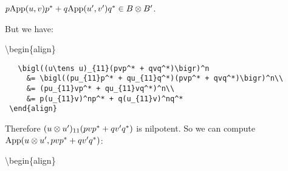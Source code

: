 \begin{description}
\tightlist
\item[]
\(p\mathrm{App}(u, v)p^* + q\mathrm{App}(u', v')q^* \in B\otimes B'\).
\end{description}

But we have:

\begin{description}
\tightlist
\item[]
\textbackslash{}begin\{align\}
\end{description}

\texttt{~~~\textbackslash{}bigl((u\textbackslash{}tens~u\textquotesingle{})\_\{11\}(pvp\^{}*~+~qv\textquotesingle{}q\^{}*)\textbackslash{}bigr)\^{}n}\\
\texttt{~~~~~\&=~\textbackslash{}bigl((pu\_\{11\}p\^{}*~+~qu\textquotesingle{}\_\{11\}q\^{}*)(pvp\^{}*~+~qv\textquotesingle{}q\^{}*)\textbackslash{}bigr)\^{}n\textbackslash{}\textbackslash{}}\\
\texttt{~~~~~\&=~(pu\_\{11\}vp\^{}*~+~qu\textquotesingle{}\_\{11\}v\textquotesingle{}q\^{}*)\^{}n\textbackslash{}\textbackslash{}}\\
\texttt{~~~~~\&=~p(u\_\{11\}v)\^{}np\^{}*~+~q(u\textquotesingle{}\_\{11\}v\textquotesingle{})\^{}nq\^{}*}\\
\texttt{~\textbackslash{}end\{align\}}

Therefore \((u\otimes u')_{11}(pvp^* + qv'q^*)\) is nilpotent. So we can
compute \(\mathrm{App}(u\otimes u', pvp^* + qv'q^*)\):

\begin{description}
\tightlist
\item[]
\textbackslash{}begin\{align\}
\end{description}

